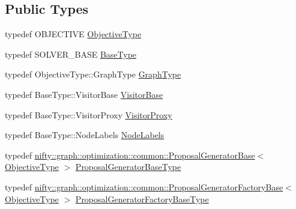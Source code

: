 \subsection*{Public Types}
\begin{DoxyCompactItemize}
\item 
typedef O\+B\+J\+E\+C\+T\+I\+V\+E \hyperlink{classnifty_1_1graph_1_1optimization_1_1common_1_1detail__cc__fusion_1_1CcFusionMoveBasedImpl_a963bf8b5310665f1aa1d3521d6f766a0}{Objective\+Type}
\item 
typedef S\+O\+L\+V\+E\+R\+\_\+\+B\+A\+S\+E \hyperlink{classnifty_1_1graph_1_1optimization_1_1common_1_1detail__cc__fusion_1_1CcFusionMoveBasedImpl_aa164d1fa9a818334d0134bc2421f3736}{Base\+Type}
\item 
typedef Objective\+Type\+::\+Graph\+Type \hyperlink{classnifty_1_1graph_1_1optimization_1_1common_1_1detail__cc__fusion_1_1CcFusionMoveBasedImpl_a76c88a1976ccfa02b9361f428ce30bc5}{Graph\+Type}
\item 
typedef Base\+Type\+::\+Visitor\+Base \hyperlink{classnifty_1_1graph_1_1optimization_1_1common_1_1detail__cc__fusion_1_1CcFusionMoveBasedImpl_abfd1605ff658ab8ad535ce8a87fc20e6}{Visitor\+Base}
\item 
typedef Base\+Type\+::\+Visitor\+Proxy \hyperlink{classnifty_1_1graph_1_1optimization_1_1common_1_1detail__cc__fusion_1_1CcFusionMoveBasedImpl_a65874a0dbbea397a1323b93a0f327a40}{Visitor\+Proxy}
\item 
typedef Base\+Type\+::\+Node\+Labels \hyperlink{classnifty_1_1graph_1_1optimization_1_1common_1_1detail__cc__fusion_1_1CcFusionMoveBasedImpl_a108afbbba4d3af19dc3ca7d6ce616cad}{Node\+Labels}
\item 
typedef \hyperlink{classnifty_1_1graph_1_1optimization_1_1common_1_1ProposalGeneratorBase}{nifty\+::graph\+::optimization\+::common\+::\+Proposal\+Generator\+Base}$<$ \hyperlink{classnifty_1_1graph_1_1optimization_1_1common_1_1detail__cc__fusion_1_1CcFusionMoveBasedImpl_a963bf8b5310665f1aa1d3521d6f766a0}{Objective\+Type} $>$ \hyperlink{classnifty_1_1graph_1_1optimization_1_1common_1_1detail__cc__fusion_1_1CcFusionMoveBasedImpl_ac65b1dd4783322f1fd38e42e10272f44}{Proposal\+Generator\+Base\+Type}
\item 
typedef \hyperlink{classnifty_1_1graph_1_1optimization_1_1common_1_1ProposalGeneratorFactoryBase}{nifty\+::graph\+::optimization\+::common\+::\+Proposal\+Generator\+Factory\+Base}$<$ \hyperlink{classnifty_1_1graph_1_1optimization_1_1common_1_1detail__cc__fusion_1_1CcFusionMoveBasedImpl_a963bf8b5310665f1aa1d3521d6f766a0}{Objective\+Type} $>$ \hyperlink{classnifty_1_1graph_1_1optimization_1_1common_1_1detail__cc__fusion_1_1CcFusionMoveBasedImpl_a947607cc31008070837e3889069f9f94}{Proposal\+Generator\+Factory\+Base\+Type}
\end{DoxyCompactItemize}
